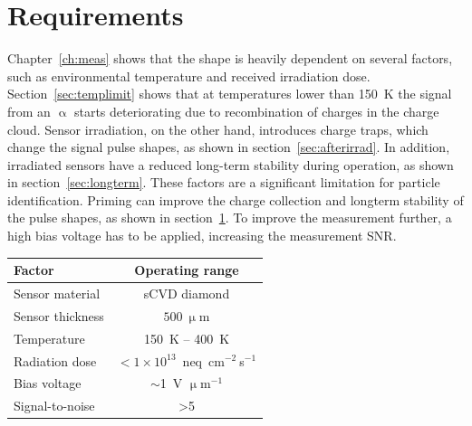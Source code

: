 \section{Requirements}
Chapter~\ref{ch:meas} shows that the shape is heavily dependent on several factors, such as environmental temperature and received irradiation dose. Section~\ref{sec:templimit} shows that at temperatures lower than 150~K the signal from an $\upalpha$ starts deteriorating due to recombination of charges in the charge cloud. Sensor irradiation, on the other hand, introduces charge traps, which change the signal pulse shapes, as shown in section~\ref{sec:afterirrad}. In addition, irradiated sensors have a reduced long-term stability during operation, as shown in section~\ref{sec:longterm}. These factors are a significant limitation for particle identification. Priming can improve the charge collection and longterm stability of the pulse shapes, as shown in section~\ref{}. To improve the measurement further, a high bias voltage has to be applied, increasing the measurement SNR.
\begin{center}
\begin{tabular}{l*{1}{c}}
Factor              & Operating range \\
\hline
Sensor material & sCVD diamond \\
Sensor thickness & $500~\upmu$m \\
Temperature & 150~K -- 400~K \\
Radiation dose & $<1\times10^{13}$~neq~cm$^{-2}~$s$^{-1}$ \\
Bias voltage & $\sim$1~V $\upmu$m$^{-1}$ \\
Signal-to-noise & >5 \\
\end{tabular}
\label{tab:limits}
\end{center}



